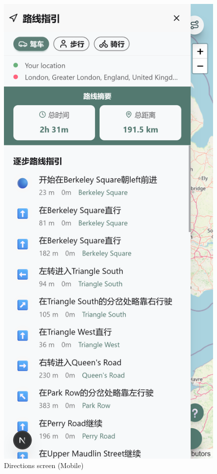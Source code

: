 \begin{figure}[H]
    \centering
    \includegraphics[height=0.3\textheight,keepaspectratio]{images/Screenshots/4_directions_mobile.png}
    \caption{Directions screen (Mobile)}
\end{figure}


